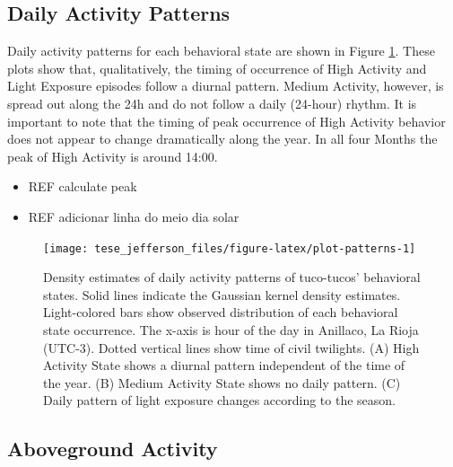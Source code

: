 \documentclass[english,msc,numbers,hidelinks]{coppe}
\providecommand{\tightlist}{%
  \setlength{\itemsep}{0pt}\setlength{\parskip}{0pt}}
\begin{document}
  \hypertarget{daily-activity-patterns}{%
  \subsection{Daily Activity Patterns}\label{daily-activity-patterns}}

  Daily activity patterns for each behavioral state are shown in Figure \ref{fig:plot-patterns}. These plots show that, qualitatively, the timing of occurrence of High Activity and Light Exposure episodes follow a diurnal pattern. Medium Activity, however, is spread out along the 24h and do not follow a daily (24-hour) rhythm. It is important to note that the timing of peak occurrence of High Activity behavior does not appear to change dramatically along the year. In all four Months the peak of High Activity is around 14:00.
  \begin{itemize}
  \tightlist
  \item
    REF calculate peak
  \item
    REF adicionar linha do meio dia solar
  \end{itemize}
  \newpage
  \begin{figure}

  {\centering \texttt{[image: tese\_jefferson\_files/figure-latex/plot-patterns-1]} 

  }

  \caption{Density estimates of daily activity patterns of tuco-tucos' behavioral states. Solid lines indicate the Gaussian kernel density estimates. Light-colored bars show observed distribution of each behavioral state occurrence. The x-axis is hour of the day in Anillaco, La Rioja (UTC-3). Dotted vertical lines show time of civil twilights. (A) High Activity State shows a diurnal pattern independent of the time of the year. (B) Medium Activity State shows no daily pattern. (C) Daily pattern of light exposure changes according to the season.}\label{fig:plot-patterns}
  \end{figure}
  \clearpage

  \hypertarget{aboveground-activity}{%
  \subsection{Aboveground Activity}\label{aboveground-activity}}
\end{document}
